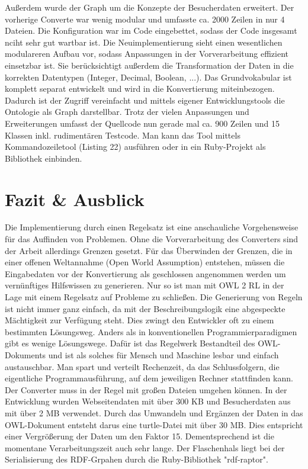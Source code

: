 \documentclass[runningheads,a4paper]{llncs}
\begin{document}
Außerdem wurde der Graph um die Konzepte der Besucherdaten erweitert.
Der vorherige Converte war wenig modular und umfasste ca. 2000 Zeilen in nur 4 Dateien.
Die Konfiguration war im Code eingebettet, sodass der Code insgesamt nciht sehr gut wartbar ist.
Die Neuimplementierung sieht einen wesentlichen modulareren Aufbau vor, sodass Anpassungen in der Vorverarbeitung effizient einsetzbar ist.
Sie berücksichtigt außerdem die Transformation der Daten in die korrekten Datentypen (Integer, Decimal, Boolean, ...).
Das Grundvokabular ist komplett separat entwickelt und wird in die Konvertierung miteinbezogen.
Dadurch ist der Zugriff vereinfacht und mittels eigener Entwicklungstools die Ontologie als Graph darstellbar.
Trotz der vielen Anpassungen und Erweiterungen umfasst der Quellcode nun gerade mal ca. 900 Zeilen und 15 Klassen inkl. rudimentären Testcode.
Man kann das Tool mittels Kommandozeiletool (Listing 22) ausführen oder in ein Ruby-Projekt als Bibliothek einbinden.



\section{Fazit \& Ausblick}
\label{sec:fazit}
Die Implementierung durch einen Regelsatz ist eine anschauliche Vorgehensweise für das Auffinden von Problemen. 
Ohne die Vorverarbeitung des Converters sind der Arbeit allerdings Grenzen gesetzt.
Für das Überwinden der Grenzen, die in einer offenen Weltannahme (Open World Assumption) entstehen, müssen die Eingabedaten vor der Konvertierung als geschlossen angenommen werden um vernünftiges Hilfswissen zu generieren.
Nur so ist man mit OWL 2 RL in der Lage mit einem Regelsatz auf Probleme zu schließen.
Die Generierung von Regeln ist nicht immer ganz einfach, da mit der Beschreibungslogik eine abgespeckte Mächtigkeit zur Verfügung steht. 
Dies zwingt den Entwickler oft zu einem bestimmten Lösungsweg.
Anders als in konventionellen Programmierparadigmen gibt es wenige Lösungswege.
Dafür ist das Regelwerk Bestandteil des OWL-Dokuments und ist als solches für Mensch und Maschine lesbar und einfach austauschbar.
Man spart und verteilt Rechenzeit, da das Schlussfolgern, die eigentliche Programmausführung, auf dem jeweiligen Rechner stattfinden kann.
Der Converter muss in der Regel mit großen Dateien umgehen können.
In der Entwicklung wurden Webseitendaten mit über 300 KB und Besucherdaten aus mit über 2 MB verwendet.
Durch das Umwandeln und Ergänzen der Daten in das OWL-Dokument entsteht darus eine turtle-Datei mit über 30 MB.
Dies entspricht einer Vergrößerung der Daten um den Faktor 15.
Dementsprechend ist die momentane Verarbeitungszeit auch sehr lange.
Der Flaschenhals liegt bei der Serialisierung des RDF-Grpahen durch die Ruby-Bibliothek {}"rdf-raptor{}".



\nocite{url_dl_primer}



\end{document}
